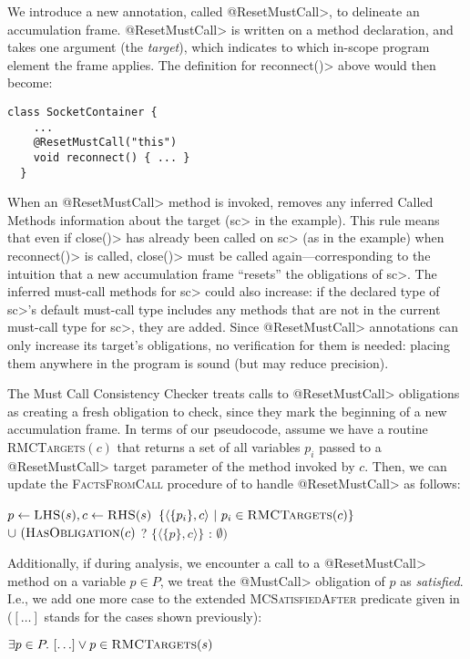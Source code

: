We introduce a new annotation, called \<@ResetMustCall>, to delineate
an accumulation frame. \<@ResetMustCall> is written on a method
declaration, and takes one argument (the \emph{target}), which
indicates to which in-scope program element the frame applies. The
definition for \<reconnect()> above would then become:

\begin{lstlisting}[frame=tb,belowskip=3mm]
  class SocketContainer {
    ...
    @ResetMustCall("this")
    void reconnect() { ... }
  }
\end{lstlisting}
When an \<@ResetMustCall>
method is invoked, \Tool removes any
inferred Called Methods information about the target (\<sc> in the example).
This rule means that even if \<close()> has already been called on \<sc>
(as in the example)
when \<reconnect()>
is called, \<close()> must be called again---corresponding to the intuition
that a new accumulation frame ``resets'' the obligations of \<sc>.
The inferred must-call methods for \<sc> could also increase:
if the declared type of \<sc>'s default must-call type includes any
methods that are not in the current must-call type for \<sc>, they are added.
Since \<@ResetMustCall> annotations can only increase its target's obligations,
no verification for them is needed: placing them anywhere in the program is sound
(but may reduce precision).

The Must Call Consistency Checker treats calls to \<@ResetMustCall> obligations
as creating a fresh obligation to check, since they mark the beginning of a new
accumulation frame.  In terms of our  pseudocode,
assume we have a routine \textsc{RMCTargets}$(c)$ that returns a set of all
variables $p_i$ passed to a \<@ResetMustCall> target parameter of the method
invoked by $c$.  Then, we can update the \textsc{FactsFromCall} procedure of
 to handle \<@ResetMustCall> as follows:
\begin{algorithmic}
  \State $p \gets \textsc{LHS}(s), c \gets \textsc{RHS}(s)$
  \State \Return $\{ \langle \{ p_i \}, c \rangle\ |\ p_i \in \textsc{RMCTargets}(c) \}$ \newline
  \hspace*{5em} $\cup\ (\textsc{HasObligation}(c)$ ? $\{ \langle \{ p \}, c \rangle \}$ : $\emptyset)$
  \EndProcedure
  \end{algorithmic}
Additionally, if during analysis, we encounter a call to a \<@ResetMustCall>
method on a variable $p \in P$, we treat the \<@MustCall>
obligation of $p$ as \emph{satisfied}.  I.e., we add one more
case to the extended \textsc{MCSatisfiedAfter} predicate given in
 ($[\ldots]$ stands for the cases shown previously):
\begin{algorithmic}
  \State \Return $\exists p \in P .\ [\ldots] \vee p \in \textsc{RMCTargets}(s)$
  \EndProcedure
\end{algorithmic}

